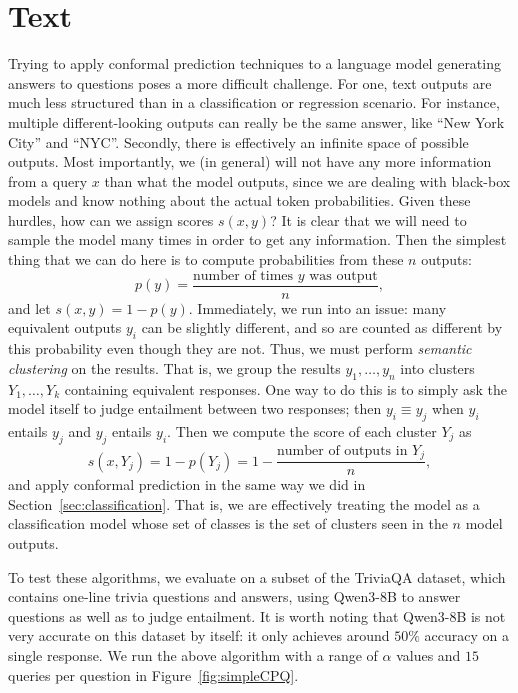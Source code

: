 \documentclass{scrartcl}
\begin{document}
\section{Text}
\label{sec:text}
Trying to apply conformal prediction techniques to a language model generating answers to questions
poses a more difficult challenge. For one, text outputs are much less structured than in a classification or regression scenario.
For instance, multiple different-looking outputs can really be the same answer, like ``New York City'' and ``NYC''.
Secondly, there is effectively an infinite space of possible outputs.
Most importantly, we (in general) will not have any more information from a query $x$ than what the model outputs, since we are dealing
with black-box models and know nothing about the actual token probabilities.
Given these hurdles, how can we assign scores $s(x, y)$?
It is clear that we will need to sample the model many times in order to get any information. Then the simplest thing
that we can do here is to compute probabilities from these $n$ outputs:
\[ p(y) = \frac{\text{number of times $y$ was output}}{n}, \]
and let $s(x, y) = 1 - p(y)$. Immediately, we run into an issue: many equivalent outputs $y_i$ can be slightly different,
and so are counted as different by this probability even though they are not. Thus, we must perform \emph{semantic clustering} on the results. That is, we group the results $y_1, \dots, y_n$ into clusters $Y_1, \dots, Y_k$ containing
equivalent responses. One way to do this is to simply ask the model itself to judge entailment between two responses;
then $y_i \equiv y_j$ when $y_i$ entails $y_j$ and $y_j$ entails $y_i$. Then we compute the score of each cluster $Y_j$ as
\[ s(x, Y_j) = 1 - p(Y_j) = 1 - \frac{\text{number of outputs in } Y_j}{n} ,\]
and apply conformal prediction in the same way we did in Section~\ref{sec:classification}. That is, we are effectively
treating the model as a classification model whose set of classes is the set of clusters seen in the $n$ model outputs. \medskip

To test these algorithms, we evaluate on a subset of the TriviaQA dataset, which contains one-line trivia questions
and answers, using Qwen3-8B to answer questions as well as to judge entailment. It is worth noting that Qwen3-8B
is not very accurate on this dataset by itself: it only achieves around $50\%$ accuracy on a single response. We run the above algorithm with a range of $\alpha$ values and $15$ queries per question in Figure~\ref{fig:simpleCPQ}. \medskip
\end{document}

